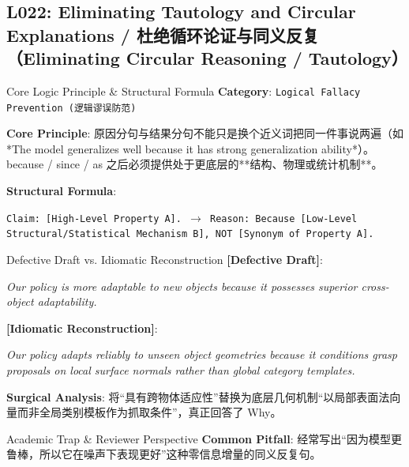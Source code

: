 \subsection{L022: Eliminating Tautology and Circular Explanations / 杜绝循环论证与同义反复（Eliminating Circular Reasoning / Tautology）}\label{sec:logic:L022}
\begin{ConceptBox}{Core Logic Principle \& Structural Formula}
\textbf{Category}: \texttt{Logical Fallacy Prevention (逻辑谬误防范)}\par\vspace{3pt}
\textbf{Core Principle}: 原因分句与结果分句不能只是换个近义词把同一件事说两遍（如 *The model generalizes well because it has strong generalization ability*）。because / since / as 之后必须提供处于更底层的**结构、物理或统计机制**。\par\vspace{4pt}
\textbf{Structural Formula}:\par\noindent\texttt{Claim: [High-Level Property A]. $\to$ Reason: Because [Low-Level Structural/Statistical Mechanism B], NOT [Synonym of Property A].}
\end{ConceptBox}
\begin{ExampleBox}{Defective Draft vs. Idiomatic Reconstruction}
\textbf{\color{TargetHighlight}[Defective Draft]}:\par\textit{Our policy is more adaptable to new objects because it possesses superior cross-object adaptability.}\par\vspace{4pt}
\textbf{\color{AcadNavy}[Idiomatic Reconstruction]}:\par\textit{Our policy adapts reliably to unseen object geometries because it conditions grasp proposals on local surface normals rather than global category templates.}\par\vspace{4pt}
\textbf{Surgical Analysis}: 将“具有跨物体适应性”替换为底层几何机制“以局部表面法向量而非全局类别模板作为抓取条件”，真正回答了 Why。
\end{ExampleBox}
\begin{TipBox}{Academic Trap \& Reviewer Perspective}
\textbf{Common Pitfall}: 经常写出“因为模型更鲁棒，所以它在噪声下表现更好”这种零信息增量的同义反复句。
\end{TipBox}
\vspace{6pt}
